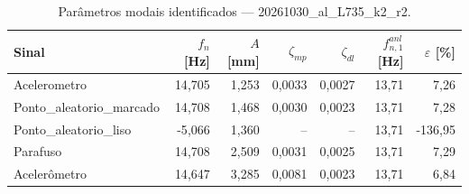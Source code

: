\begin{table}[htbp]
  \centering
  \caption{Parâmetros modais identificados — 20261030\_al\_L735\_k2\_r2.}
  \label{tab:modal_20261030_al_L735_k2_r2}
  \begin{tabular}{lrrrrrr}
    \toprule
    Sinal & $f_n$ [Hz] & $A$ [mm] & $\zeta_{mp}$ & $\zeta_{dl}$ & $f_{n,1}^{anl}$ [Hz] & $\varepsilon$ [\%] \\
    \midrule
    Acelerometro & 14{,}705 & 1{,}253 & 0{,}0033 & 0{,}0027 & 13{,}71 & 7{,}26 \\
    Ponto\_aleatorio\_marcado & 14{,}708 & 1{,}468 & 0{,}0030 & 0{,}0023 & 13{,}71 & 7{,}28 \\
    Ponto\_aleatorio\_liso & -5{,}066 & 1{,}360 & -- & -- & 13{,}71 & -136{,}95 \\
    Parafuso & 14{,}708 & 2{,}509 & 0{,}0031 & 0{,}0025 & 13{,}71 & 7{,}29 \\
    Acelerômetro & 14{,}647 & 3{,}285 & 0{,}0081 & 0{,}0023 & 13{,}71 & 6{,}84 \\
    \bottomrule
  \end{tabular}
\end{table}

